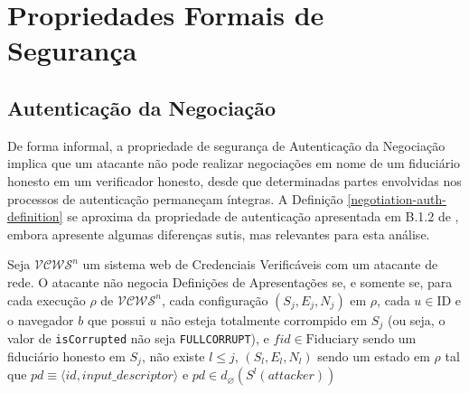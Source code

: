 \section{Propriedades Formais de Segurança}

\subsection*{Autenticação da Negociação}

De forma informal, a propriedade de segurança de Autenticação da Negociação implica que um atacante não pode realizar negociações em nome de um fiduciário honesto em um verificador honesto, desde que determinadas partes envolvidas nos processos de autenticação permaneçam íntegras. A Definição \ref{negotiation-auth-definition} se aproxima da propriedade de autenticação apresentada em B.1.2 de \cite{hauck2023openid}, embora apresente algumas diferenças sutis, mas relevantes para esta análise.

\begin{definicao}\label{negotiation-auth-definition}
Seja $\mathcal{VCWS}^n$ um sistema web de Credenciais Verificáveis com um atacante de rede. 
O atacante não negocia Definições de Apresentações se, e somente se, para cada execução $\rho$ de $\mathcal{VCWS}^n$, cada configuração $(S_j, E_j, N_j)$ em $\rho$, 
cada $u \in \text{ID}$ e o navegador $b$ que possui $u$ não esteja totalmente corrompido em $S_j$ (ou seja, o valor de \texttt{isCorrupted} não seja \texttt{FULLCORRUPT}), e $fid \in \text{Fiduciary}$ sendo um fiduciário honesto em $S_j$, 
não existe \( l \leq j \), \( (S_l, E_l, N_l) \) sendo um estado em \( \rho \) tal que $pd \equiv \langle id, input\_descriptor \rangle$ e  \( pd \in d_\varnothing (S^l(attacker)) \)
\end{definicao}